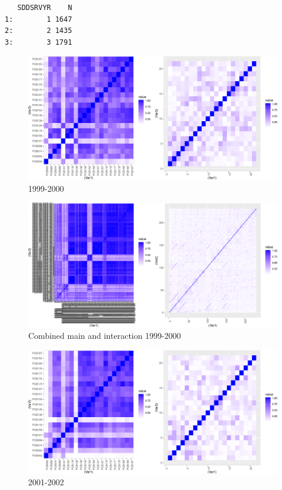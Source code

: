 \documentclass[]{article}
\begin{document}
\begin{verbatim}
   SDDSRVYR    N
1:        1 1647
2:        2 1435
3:        3 1791
\end{verbatim}

\begin{figure}
\centering
\includegraphics{PCBs_covariance_files/figure-latex/unnamed-chunk-5-1.pdf}
\caption{1999-2000}
\end{figure}

\begin{figure}
\centering
\includegraphics{PCBs_covariance_files/figure-latex/unnamed-chunk-6-1.pdf}
\caption{Combined main and interaction 1999-2000}
\end{figure}

\begin{figure}
\centering
\includegraphics{PCBs_covariance_files/figure-latex/unnamed-chunk-7-1.pdf}
\caption{2001-2002}
\end{figure}
\end{document}
